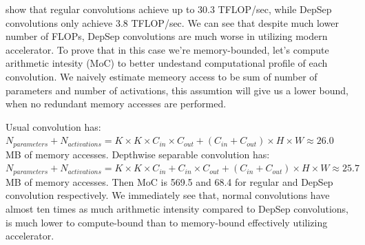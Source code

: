 % 

% 

show that regular convolutions achieve up to 30.3 TFLOP/sec, while DepSep convolutions only achieve 3.8 TFLOP/sec. We can see that despite much lower number of FLOPs, DepSep convolutions are much worse in utilizing modern accelerator. To prove that in this case we're memory-bounded, let's compute arithmetic intesity (MoC) to better undestand computational profile of each convolution. We naively estimate memeory access to be sum of number of parameters and number of activations, this assumtion will give us a lower bound, when no redundant memory accesses are performed. 


Usual convolution has: $ N_{parameters} + N_{activations} = K \times K \times C_{in} \times C_{out} + (C_{in} + C_{out}) \times H \times W \approx 26.0$ MB of memory accesses. Depthwise separable convolution has: $ N_{parameters} + N_{activations} = K \times K \times C_{in} + C_{in} \times C_{out} + (C_{in} + C_{out}) \times H \times W \approx 25.7$ MB of memory accesses. Then MoC is 569.5 and 68.4 for regular and DepSep convolution respectively. We immediately see that, normal convolutions have almost ten times as much arithmetic intensity compared to DepSep convolutions, is much lower to compute-bound than to memory-bound effectively utilizing accelerator. 

